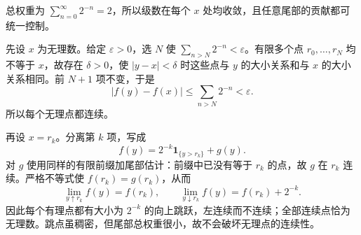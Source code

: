 总权重为 $\sum_{n=0}^\infty2^{-n}=2$，所以级数在每个 $x$ 处均收敛，且任意尾部的贡献都可统一控制。

先设 $x$ 为无理数。给定 $\varepsilon>0$，选 $N$ 使 $\sum_{n>N}2^{-n}<\varepsilon$。有限多个点 $r_0,\ldots,r_N$ 均不等于 $x$，故存在 $\delta>0$，使 $|y-x|<\delta$ 时这些点与 $y$ 的大小关系和与 $x$ 的大小关系相同。前 $N+1$ 项不变，于是
\[
 |f(y)-f(x)|\le\sum_{n>N}2^{-n}<\varepsilon.
\]
所以每个无理点都连续。

再设 $x=r_k$。分离第 $k$ 项，写成
\[
 f(y)=2^{-k}\mathbf1_{\{y>r_k\}}+g(y).
\]
对 $g$ 使用同样的有限前缀加尾部估计：前缀中已没有等于 $r_k$ 的点，故 $g$ 在 $r_k$ 连续。严格不等式使 $f(r_k)=g(r_k)$，从而
\[
 \boxed{\lim_{y\uparrow r_k}f(y)=f(r_k),\qquad
 \lim_{y\downarrow r_k}f(y)=f(r_k)+2^{-k}.}
\]
因此每个有理点都有大小为 $2^{-k}$ 的向上跳跃，左连续而不连续；全部连续点恰为无理数。跳点虽稠密，但尾部总权重很小，故不会破坏无理点的连续性。
